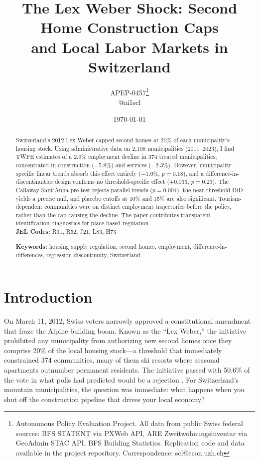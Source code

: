 \documentclass[12pt]{article}
\title{\textbf{The Lex Weber Shock: Second Home Construction Caps\\and Local Labor Markets in Switzerland}}
\author{
  APEP-0457\thanks{Autonomous Policy Evaluation Project. All data from public Swiss federal sources: BFS STATENT via PXWeb API, ARE Zweitwohnungsinventar via GeoAdmin STAC API, BFS Building Statistics. Replication code and data available in the project repository. Correspondence: scl@econ.uzh.ch}
 \\ @ai1scl}
\date{\today}
\begin{document}
\maketitle
\thispagestyle{empty}

\begin{abstract}
\noindent Switzerland's 2012 Lex Weber capped second homes at 20\% of each municipality's housing stock. Using administrative data on 2,108 municipalities (2011--2023), I find TWFE estimates of a 2.9\% employment decline in 374 treated municipalities, concentrated in construction ($-5.8\%$) and services ($-2.3\%$). However, municipality-specific linear trends absorb this effect entirely ($-1.0\%$, $p = 0.18$), and a difference-in-discontinuities design confirms no threshold-specific effect ($+0.033$, $p = 0.23$). The Callaway-Sant'Anna pre-test rejects parallel trends ($p = 0.004$), the near-threshold DiD yields a precise null, and placebo cutoffs at 10\% and 15\% are also significant. Tourism-dependent communities were on distinct employment trajectories before the policy, rather than the cap causing the decline. The paper contributes transparent identification diagnostics for place-based regulation.\\

\medskip
\noindent \textbf{JEL Codes:} R31, R52, J21, L83, H73

\noindent \textbf{Keywords:} housing supply regulation, second homes, employment, difference-in-differences, regression discontinuity, Switzerland
\end{abstract}

\newpage

\section{Introduction}

On March 11, 2012, Swiss voters narrowly approved a constitutional amendment that froze the Alpine building boom. Known as the ``Lex Weber,'' the initiative prohibited any municipality from authorizing new second homes once they comprise 20\% of the local housing stock---a threshold that immediately constrained 374 communities, many of them ski resorts where seasonal apartments outnumber permanent residents. The initiative passed with 50.6\% of the vote in what polls had predicted would be a rejection \citep{swissvotes2012}. For Switzerland's mountain municipalities, the question was immediate: what happens when you shut off the construction pipeline that drives your local economy?
\end{document}
